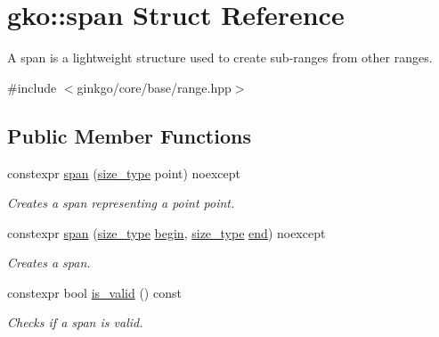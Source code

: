 \hypertarget{structgko_1_1span}{}\section{gko\+:\+:span Struct Reference}
\label{structgko_1_1span}


A span is a lightweight structure used to create sub-\/ranges from other ranges.  




{\ttfamily \#include $<$ginkgo/core/base/range.\+hpp$>$}

\subsection*{Public Member Functions}
\begin{DoxyCompactItemize}
\item 
constexpr \hyperlink{structgko_1_1span_a2aafb0414ef14fac91296066f7426d6d}{span} (\hyperlink{namespacegko_a6e5c95df0ae4e47aab2f604a22d98ee7}{size\+\_\+type} point) noexcept
\begin{DoxyCompactList}\small\item\em Creates a span representing a point {\ttfamily point}. \end{DoxyCompactList}\item 
constexpr \hyperlink{structgko_1_1span_a1566e1ab67312a6b9ece66fa4f5c8799}{span} (\hyperlink{namespacegko_a6e5c95df0ae4e47aab2f604a22d98ee7}{size\+\_\+type} \hyperlink{structgko_1_1span_a54ff06eda27a98b62e83c7e9e7b6dcd7}{begin}, \hyperlink{namespacegko_a6e5c95df0ae4e47aab2f604a22d98ee7}{size\+\_\+type} \hyperlink{structgko_1_1span_af68200dea4456e1bd3511c3b14bc2886}{end}) noexcept
\begin{DoxyCompactList}\small\item\em Creates a span. \end{DoxyCompactList}\item 
constexpr bool \hyperlink{structgko_1_1span_a32a87f434708e6857820858503f9b133}{is\+\_\+valid} () const
\begin{DoxyCompactList}\small\item\em Checks if a span is valid. \end{DoxyCompactList}\end{DoxyCompactItemize}
